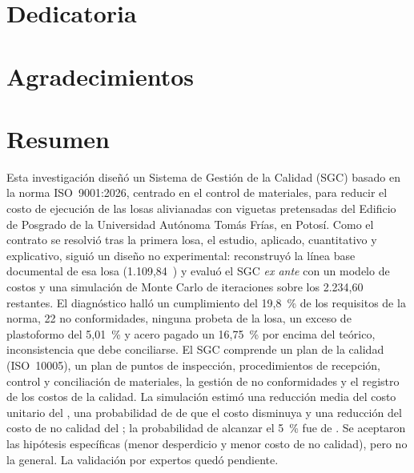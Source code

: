 \chapter*{Dedicatoria}

\chapter*{Agradecimientos}

\chapter*{Resumen}
\noindent Esta investigación diseñó un Sistema de Gestión de la Calidad (SGC) basado en la norma ISO~9001:2026, centrado en el control de materiales, para reducir el costo de ejecución de las losas alivianadas con viguetas pretensadas del Edificio de Posgrado de la Universidad Autónoma Tomás Frías, en Potosí. Como el contrato se resolvió tras la primera losa, el estudio, aplicado, cuantitativo y explicativo, siguió un diseño no experimental: reconstruyó la línea base documental de esa losa (1.109,84~\mdos{}) y evaluó el SGC \emph{ex ante} con un modelo de costos y una simulación de Monte Carlo de \MCiter{} iteraciones sobre los 2.234,60~\mdos{} restantes. El diagnóstico halló un cumplimiento del 19,8~\% de los requisitos de la norma, 22 no conformidades, ninguna probeta de la losa, un exceso de plastoformo del 5,01~\% y acero pagado un 16,75~\% por encima del teórico, inconsistencia que debe conciliarse. El SGC comprende un plan de la calidad (ISO~10005), un plan de puntos de inspección, procedimientos de recepción, control y conciliación de materiales, la gestión de no conformidades y el registro de los costos de la calidad. La simulación estimó una reducción media del costo unitario del \rMedia{}, una probabilidad de \PRpos{} de que el costo disminuya y una reducción del costo de no calidad del \CNCreduccionPct{}; la probabilidad de alcanzar el 5~\% fue de \PHG{}. Se aceptaron las hipótesis específicas (menor desperdicio y menor costo de no calidad), pero no la general. La validación por expertos quedó pendiente.

